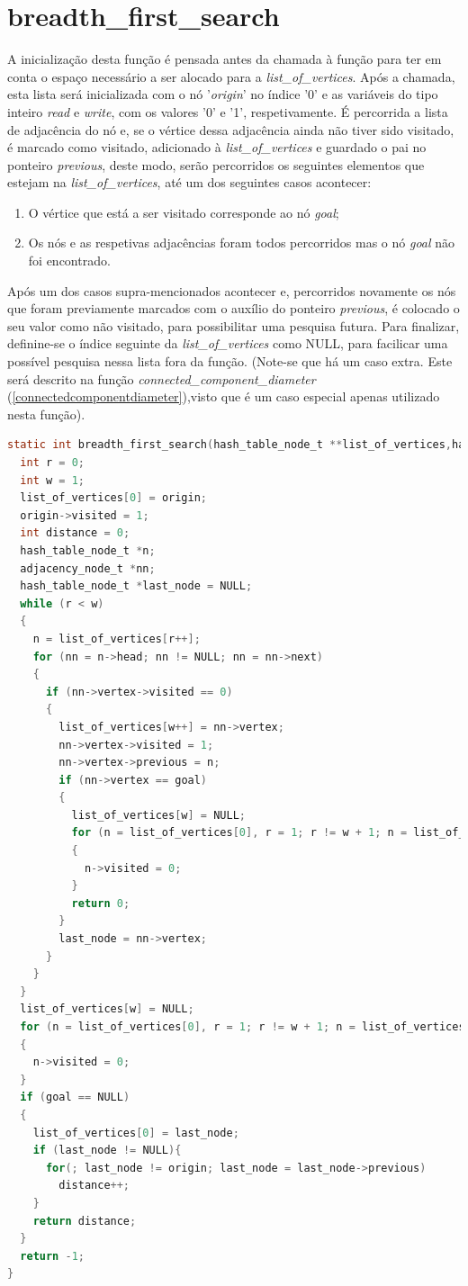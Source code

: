 	\section{breadth\_first\_search}
	\label{breadthfirstsearch}
A inicialização desta função é pensada antes da chamada à função para ter em conta o espaço
necessário a ser alocado para a \textit{list\_of\_vertices}. Após a chamada, esta lista será inicializada
com o nó '\textit{origin}' no índice '0' e as variáveis do tipo inteiro \textit{read} e \textit{write}, com os valores '0' e '1', respetivamente.
É percorrida a lista de adjacência do nó e, se o vértice dessa adjacência ainda não tiver sido visitado,
é marcado como visitado, adicionado à \textit{list\_of\_vertices} e guardado o pai no ponteiro \textit{previous}, deste modo, serão percorridos os seguintes 
elementos que estejam na \textit{list\_of\_vertices}, até um dos seguintes casos acontecer:
\begin{enumerate}
\item O vértice que está a ser visitado corresponde ao nó \textit{goal};
\item Os nós e as respetivas adjacências foram todos percorridos mas o nó \textit{goal} não foi encontrado.
\end{enumerate}
Após um dos casos supra-mencionados acontecer e, percorridos novamente os nós que foram previamente marcados com o auxílio do ponteiro \textit{previous}, 
é colocado o seu valor como não visitado, para possibilitar uma pesquisa futura. Para finalizar, definine-se o índice seguinte da \textit{list\_of\_vertices} como NULL,
para facilicar uma possível pesquisa nessa lista fora da função.
(Note-se que há um caso extra. Este será descrito na função \textit{connected\_component\_diameter} (\ref{connectedcomponentdiameter}),visto que é um caso especial
apenas utilizado nesta função).

	\begin{lstlisting}[language=C]
static int breadth_first_search(hash_table_node_t **list_of_vertices,hash_table_node_t *origin,hash_table_node_t *goal){
  int r = 0;
  int w = 1;
  list_of_vertices[0] = origin;
  origin->visited = 1;
  int distance = 0;
  hash_table_node_t *n;
  adjacency_node_t *nn;
  hash_table_node_t *last_node = NULL;
  while (r < w)
  {
    n = list_of_vertices[r++];
    for (nn = n->head; nn != NULL; nn = nn->next)
    {
      if (nn->vertex->visited == 0)
      {
        list_of_vertices[w++] = nn->vertex;
        nn->vertex->visited = 1;
        nn->vertex->previous = n;
        if (nn->vertex == goal)
        {
          list_of_vertices[w] = NULL;
          for (n = list_of_vertices[0], r = 1; r != w + 1; n = list_of_vertices[r++])
          {
            n->visited = 0;
          }
          return 0;
        }
        last_node = nn->vertex;
      }
    }
  }
  list_of_vertices[w] = NULL;
  for (n = list_of_vertices[0], r = 1; r != w + 1; n = list_of_vertices[r++])
  {
    n->visited = 0;
  }
  if (goal == NULL)
  {
    list_of_vertices[0] = last_node;
    if (last_node != NULL){
      for(; last_node != origin; last_node = last_node->previous)
        distance++;
    }
    return distance;
  }
  return -1;
}
	\end{lstlisting}
	
